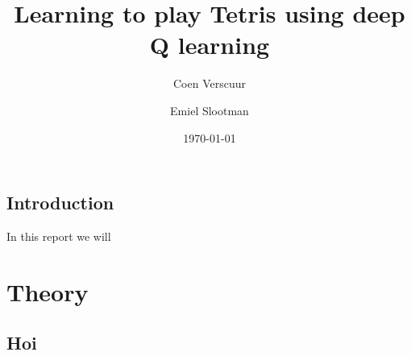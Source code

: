 \documentclass{report}
\title{Learning to play Tetris using deep Q learning}
\author{Coen Verscuur \and Emiel Slootman}
\date{\today}
\begin{document}
\maketitle

\section{Introduction}
In this report we will 

\chapter{Theory}
\section{Hoi}
\end{document}
